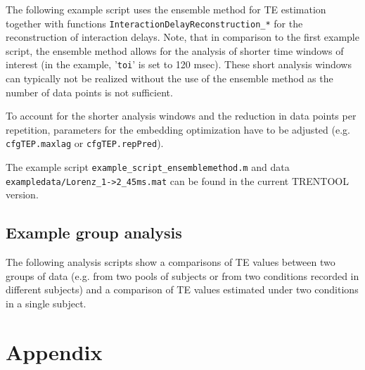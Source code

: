 \documentclass[a4paper,10pt]{article}
\begin{document}
The following example script uses the ensemble method for TE estimation together with functions \texttt{InteractionDelayReconstruction\_*} for the reconstruction of interaction delays. Note, that in comparison to the first example script, the ensemble method allows for the analysis of shorter time windows of interest (in the example, '\verb&toi&' is set to 120 msec). These short analysis windows can typically not be realized without the use of the ensemble method as the number of data points is not sufficient.

To account for the shorter analysis windows and the reduction in data points per repetition, parameters for the embedding optimization have to be adjusted (e.g. \verb&cfgTEP.maxlag& or \verb&cfgTEP.repPred&).

The example script \texttt{example\_script\_ensemblemethod.m} and data \texttt{exampledata/Lorenz\_1->2\_45ms.mat} can be found in the current TRENTOOL version.




\subsection{Example group analysis}

The following analysis scripts show a comparisons of TE values between two groups of data (e.g. from two pools of subjects or from two conditions recorded in different subjects) and a comparison of TE values estimated under two conditions in a single subject.






\newpage
\section{Appendix} \label{sec:appendix}
\end{document}
